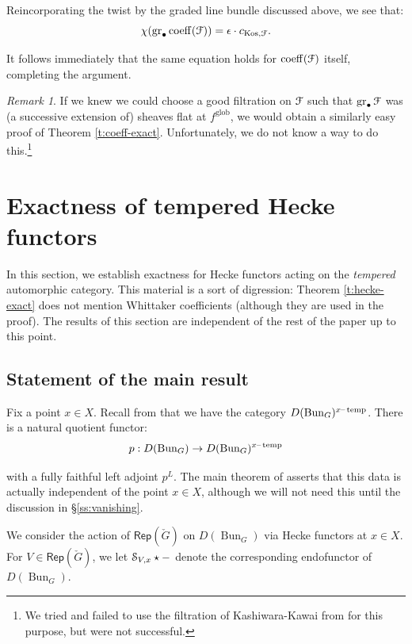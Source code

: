 \documentclass[reqno,11pt]{amsart}
\numberwithin{equation}{subsection}
\theoremstyle{remark}
\newtheorem{rem}[thm]{Remark}
\newcommand{\eps}{\epsilon}
\newcommand{\sF}{{\EuScript F}}
\newcommand{\sS}{{\EuScript S}}
\newcommand{\on}{\operatorname}
\newcommand{\mathendash}{\text{\textendash}}
\newcommand{\Rep}{\mathsf{Rep}}
\newcommand{\gr}{\on{gr}}
\renewcommand{\dot}{\bullet}
\newcommand{\Bun}{\on{Bun}}
\newcommand{\coeff}{\on{coeff}}
\newcommand{\xtemp}{x\mathendash\on{temp}}
\newcommand{\Kos}{\on{Kos}}
\begin{document}
\noindent Reincorporating the twist by the graded line bundle
discussed above, we see that:
%
\[
\chi(\gr_{\dot}\coeff(\sF)) = \eps \cdot c_{\Kos,\sF}.
\]

It follows immediately that the same equation holds 
for $\coeff(\sF)$ itself, completing the argument.

\begin{rem}

If we knew we could choose a good filtration on $\sF$
such that $\gr_{\dot}\sF$ was (a successive extension of) 
sheaves flat at $f^{\on{glob}}$, we would obtain a similarly easy proof of
Theorem \ref{t:coeff-exact}. Unfortunately, we do not know a way to do 
this.\footnote{We tried and
failed to use the filtration of Kashiwara-Kawai from \cite{kashiwara-kawai} for this
purpose, but were not successful.}

\end{rem}

\section{Exactness of tempered Hecke functors}\label{s:hecke-exact}

In this section, we establish exactness for Hecke functors acting on the 
\emph{tempered} automorphic category. 
This material is a sort of digression: Theorem \ref{t:hecke-exact} does
not mention Whittaker coefficients (although they are used in the proof).
The results of this section are
independent of the rest of the paper up to this point. 

\subsection{Statement of the main result}

Fix a point $x \in X$. 
Recall from \cite{independence} that we have the category 
$D(\Bun_G)^{\xtemp}$. There is a natural quotient functor:
%
\[
p:D(\Bun_G) \to D(\Bun_G)^{\xtemp}
\]

\noindent with a fully faithful left adjoint $p^L$. The main theorem
of \cite{independence} asserts that this data is actually independent of the
point $x \in X$, although we will not need this until the discussion in 
\S \ref{ss:vanishing}. 

We consider the action of $\Rep(\check{G})$ on $D(\Bun_G)$ via
Hecke functors at $x \in X$. For $V \in \Rep(\check{G})$, we let
$\sS_{V,x} \star -$ denote the corresponding endofunctor of $D(\Bun_G)$.
\end{document}
